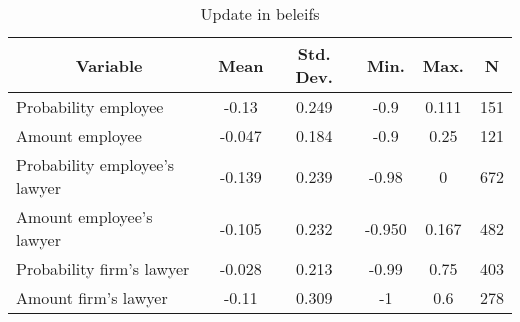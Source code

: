 
\begin{table}[htbp]\centering \caption{Update in beleifs \label{sumstat}}
\begin{tabular}{l c c c c c}\hline\hline
\multicolumn{1}{c}{\textbf{Variable}} & \textbf{Mean}
 & \textbf{Std. Dev.}& \textbf{Min.} &  \textbf{Max.} & \textbf{N}\\ \hline
Probability employee & -0.13 & 0.249 & -0.9 & 0.111 & 151\\
Amount employee & -0.047 & 0.184 & -0.9 & 0.25 & 121\\
Probability employee's lawyer & -0.139 & 0.239 & -0.98 & 0 & 672\\
Amount employee's lawyer & -0.105 & 0.232 & -0.950 & 0.167 & 482\\
Probability firm's lawyer & -0.028 & 0.213 & -0.99 & 0.75 & 403\\
Amount firm's lawyer & -0.11 & 0.309 & -1 & 0.6 & 278\\
\hline\end{tabular}
\end{table}
